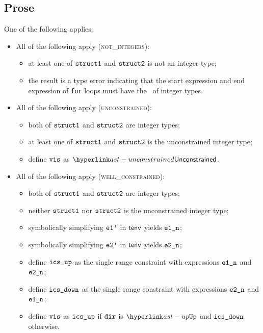\subsection{Prose}
One of the following applies:
\begin{itemize}
  \item All of the following apply (\textsc{not\_integers}):
  \begin{itemize}
    \item at least one of $\texttt{struct1}$ and $\texttt{struct2}$ is not an integer type;
    \item the result is a type error indicating that the start expression and end expression of \texttt{for} loops
          must have the \structure\ of integer types.
  \end{itemize}

  \item All of the following apply (\textsc{unconstrained}):
  \begin{itemize}
    \item both of $\texttt{struct1}$ and $\texttt{struct2}$ are integer types;
    \item at least one of $\texttt{struct1}$ and $\texttt{struct2}$ is the unconstrained integer type;
    \item define $\texttt{vis}$ as $\unconstrained$.
  \end{itemize}

  \item All of the following apply (\textsc{well\_constrained}):
  \begin{itemize}
    \item both of $\texttt{struct1}$ and $\texttt{struct2}$ are integer types;
    \item neither $\texttt{struct1}$ nor $\texttt{struct2}$ is the unconstrained integer type;
    \item symbolically simplifying $\texttt{e1'}$ in $\textsf{tenv}$ yields $\texttt{e1\_n}$\ProseOrTypeError;
    \item symbolically simplifying $\texttt{e2'}$ in $\textsf{tenv}$ yields $\texttt{e2\_n}$\ProseOrTypeError;
    \item define $\texttt{ics\_up}$ as the single range constraint with expressions $\texttt{e1\_n}$ and $\texttt{e2\_n}$;
    \item define $\texttt{ics\_down}$ as the single range constraint with expressions $\texttt{e2\_n}$ and $\texttt{e1\_n}$;
    \item define $\texttt{vis}$ as $\texttt{ics\_up}$ if $\texttt{dir}$ is $\UP$ and $\texttt{ics\_down}$ otherwise.
  \end{itemize}
\end{itemize}

